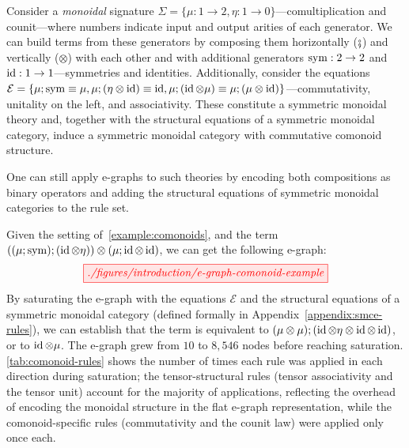 \begin{example}\label{example:comonoids}
Consider a \emph{monoidal} signature $\Sigma = \{\mu : 1 \to 2, \eta : 1 \to 0\}$---comultiplication and counit---where numbers indicate input and output arities of each generator.
We can build terms from these generators by composing them horizontally ($\fatsemi$) and vertically ($\otimes$) with each other and with additional generators $\operatorname{sym} : 2 \to 2$ and $\operatorname{id} : 1 \to 1$---symmetries and identities.
Additionally, consider the equations $\mathcal{E} = \{\mu ; \operatorname{sym} \equiv \mu, \mu ; (\eta \otimes \operatorname{id}) \equiv \operatorname{id}, \mu ; (\operatorname{id} \otimes \mu) \equiv \mu ; (\mu \otimes \operatorname{id})\}$---commutativity, unitality on the left, and associativity.
These constitute a symmetric monoidal theory and, together with the structural equations of a symmetric monoidal category, induce a symmetric monoidal category with commutative comonoid structure.
\end{example}

One can still apply e-graphs to such theories by encoding both compositions as binary operators and adding the structural equations of symmetric monoidal categories to the rule set.

\begin{example}\label{example:sat-comonoid}
Given the setting of~\cref{example:comonoids}, and the term $((\mu;\operatorname{sym});(\operatorname{id} \otimes \eta)) \otimes (\mu ; \operatorname{id} \otimes \operatorname{id})$, we can get the following e-graph:
\[
\tikzfig{./figures/introduction/e-graph-comonoid-example}
\]
By saturating the e-graph with the equations $\mathcal{E}$ and the structural equations of a symmetric monoidal category (defined formally in Appendix~\ref{appendix:smce-rules}), we can establish that the term is equivalent to $(\mu \otimes \mu);(\operatorname{id} \otimes \eta \otimes \operatorname{id} \otimes \operatorname{id})$, or to $\operatorname{id} \otimes \mu$.
The e-graph grew from $10$ to $8{,}546$ nodes before reaching saturation.
\cref{tab:comonoid-rules} shows the number of times each rule was applied in each direction during saturation; the tensor-structural rules (tensor associativity and the tensor unit) account for the majority of applications, reflecting the overhead of encoding the monoidal structure in the flat e-graph representation, while the comonoid-specific rules (commutativity and the counit law) were applied only once each.
\end{example}

